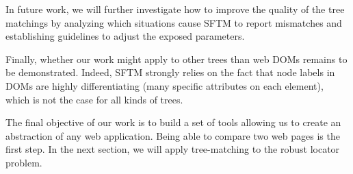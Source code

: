 In future work, we will further investigate how to improve the quality of the tree matchings by analyzing which situations cause SFTM to report mismatches and establishing guidelines to adjust the exposed parameters.

Finally, whether our work might apply to other trees than web DOMs remains to be demonstrated.
Indeed, SFTM strongly relies on the fact that node labels in DOMs are highly differentiating (many specific attributes on each element), which is not the case for all kinds of trees.

The final objective of our work is to build a set of tools allowing us to create an abstraction of any web application. Being able to compare two web pages is the first step.
In the next section, we will apply tree-matching to the robust locator problem.







